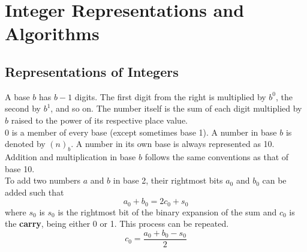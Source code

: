 \documentclass[./Discrete Math.tex]{subfiles}
\begin{document}
	
	\setcounter{section}{1}
	\section{Integer Representations and Algorithms}
		\setcounter{subsection}{1}
		\subsection{Representations of Integers}
			A base \(b\) has \(b - 1\) digits. The first digit from the right is multiplied by \(b^0\), the second by \(b^1\), and so on. The number itself is the sum of each digit multiplied by \(b\) raised to the power of its respective place value. \\
			0 is a member of every base (except sometimes base 1).
			A number in base \(b\) is denoted by \((n)_b\).
			A number in its own base is always represented as 10. \\
			Addition and multiplication in base \(b\) follows the same conventions as that of base 10. \\
			To add two numbers \(a\) and \(b\) in base 2, their rightmost bits \(a_0\) and \(b_0\) can be added such that \\
				\[a_0 + b_0 = 2c_0 + s_0\]
				where \(s_0\) is \(s_0\) is the rightmost bit of the binary expansion of the sum and \(c_0\) is the \textbf{carry}, being either 0 or 1. This process can be repeated. \\
				\[c_0 = \frac{a_0 + b_0 - s_0}{2}\]
\end{document}
